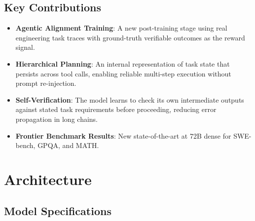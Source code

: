 \documentclass[11pt,a4paper]{article}
\begin{document}
\subsection{Key Contributions}

\begin{itemize}
    \item \textbf{Agentic Alignment Training}: A new post-training stage using real engineering
    task traces with ground-truth verifiable outcomes as the reward signal.
    \item \textbf{Hierarchical Planning}: An internal representation of task state that persists
    across tool calls, enabling reliable multi-step execution without prompt re-injection.
    \item \textbf{Self-Verification}: The model learns to check its own intermediate outputs
    against stated task requirements before proceeding, reducing error propagation in long chains.
    \item \textbf{Frontier Benchmark Results}: New state-of-the-art at 72B dense for SWE-bench,
    GPQA, and MATH.
\end{itemize}

\section{Architecture}

\subsection{Model Specifications}
\end{document}
